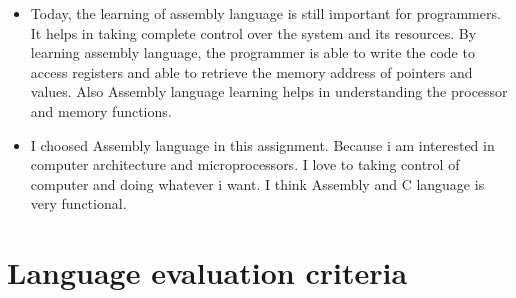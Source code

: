 \documentclass[11pt]{article}
\begin{document}
\begin{itemize}
	\item { Today, the learning of assembly language is still important for programmers. It helps in taking complete control over the system and its resources. By learning assembly language, the programmer is able to write the code to access registers and able to retrieve the memory address of pointers and values. Also Assembly language learning helps in understanding the processor and memory functions. }
	\item { I choosed Assembly language in this assignment. Because i am interested in computer architecture and microprocessors. I love to taking control of computer and doing whatever i want. I think Assembly and C language is very functional.} 
\end{itemize}

\section{Language evaluation criteria}
\end{document}
